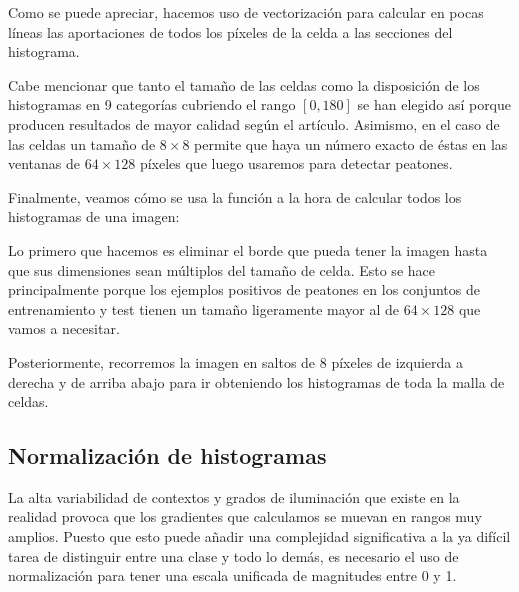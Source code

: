 \documentclass[11pt,a4paper]{article}
\begin{document}

            \par
            Como se puede apreciar, hacemos uso de vectorización para calcular en pocas líneas las aportaciones de todos los píxeles de la celda a las secciones del histograma.

            \par
            Cabe mencionar que tanto el tamaño de las celdas como la disposición de los histogramas en 9 categorías cubriendo el rango $\left[0,180\right]$ se han elegido así porque producen resultados de mayor calidad según el artículo. Asimismo, en el caso de las celdas un tamaño de $8\times8$ permite que haya un número exacto de éstas en las ventanas de $64\times128$ píxeles que luego usaremos para detectar peatones.

            \par
            Finalmente, veamos cómo se usa la función a la hora de calcular todos los histogramas de una imagen:


            \par
            Lo primero que hacemos es eliminar el borde que pueda tener la imagen hasta que sus dimensiones sean múltiplos del tamaño de celda. Esto se hace principalmente porque los ejemplos positivos de peatones en los conjuntos de entrenamiento y test tienen un tamaño ligeramente mayor al de $64\times128$ que vamos a necesitar.

            \par
            Posteriormente, recorremos la imagen en saltos de 8 píxeles de izquierda a derecha y de arriba abajo para ir obteniendo los histogramas de toda la malla de celdas.

        \subsection{Normalización de histogramas}

            \par
            La alta variabilidad de contextos y grados de iluminación que existe en la realidad provoca que los gradientes que calculamos se muevan en rangos muy amplios. Puesto que esto puede añadir una complejidad significativa a la ya difícil tarea de distinguir entre una clase y todo lo demás, es necesario el uso de normalización para tener una escala unificada de magnitudes entre 0 y 1.
\end{document}
